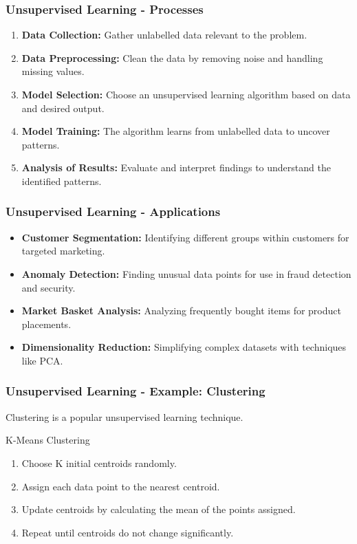 \documentclass[aspectratio=169]{beamer}
\begin{document}
\begin{frame}[fragile]
    \frametitle{Unsupervised Learning - Processes}
    \begin{enumerate}
        \item \textbf{Data Collection:} Gather unlabelled data relevant to the problem.
        \item \textbf{Data Preprocessing:} Clean the data by removing noise and handling missing values.
        \item \textbf{Model Selection:} Choose an unsupervised learning algorithm based on data and desired output.
        \item \textbf{Model Training:} The algorithm learns from unlabelled data to uncover patterns.
        \item \textbf{Analysis of Results:} Evaluate and interpret findings to understand the identified patterns.
    \end{enumerate}
\end{frame}

\begin{frame}[fragile]
    \frametitle{Unsupervised Learning - Applications}
    \begin{itemize}
        \item \textbf{Customer Segmentation:} Identifying different groups within customers for targeted marketing.
        \item \textbf{Anomaly Detection:} Finding unusual data points for use in fraud detection and security.
        \item \textbf{Market Basket Analysis:} Analyzing frequently bought items for product placements.
        \item \textbf{Dimensionality Reduction:} Simplifying complex datasets with techniques like PCA.
    \end{itemize}
\end{frame}

\begin{frame}[fragile]
    \frametitle{Unsupervised Learning - Example: Clustering}
    Clustering is a popular unsupervised learning technique.
    \begin{block}{K-Means Clustering}
        \begin{enumerate}
            \item Choose K initial centroids randomly.
            \item Assign each data point to the nearest centroid.
            \item Update centroids by calculating the mean of the points assigned.
            \item Repeat until centroids do not change significantly.
        \end{enumerate}
    \end{block}
\end{frame}
\end{document}
